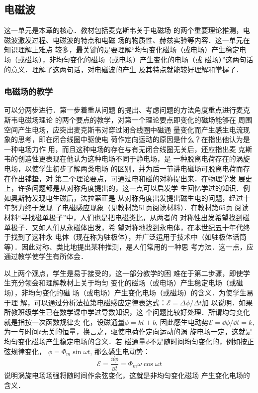 \subsection{电磁波}
这一单元是本章的核心．教材包括麦克斯韦关于电磁场
的两个重要理论推测，电磁波激发过程、电磁波的特点和电磁
场的物质性、赫兹实验等内容．这一单元在知识理解上难点
较多，最关键的是要理解“均匀变化磁场（或电场）产生稳定电
场（或磁场），非均匀变化的磁场（或电场）产生变化的电场（或
磁场）”这两句话的意义．理解了这两句话，对电磁波的产生
及其特点就能较好理解和掌握了．

\subsubsection{电磁场的教学}

可以分两步进行．第一步着重从问题
的提出、考虑问题的方法角度重点进行麦克斯韦电磁场理论
的两个要点的教学，对第一个理论要点即变化的磁场能够在
周围空间产生电场，应突出麦克斯韦对穿过闭合线圈中磁通
量变化而产生感生电流现象的思考，即在闭合线圈中驱使电
荷作定向运动的原因是什么？在指出他认为是一种电场力作
用，而且这种电场的存在与有无闭合线圈无关后，还应指出麦
克斯韦的创造性更表现在他认为这种电场不同于静电场，是
一种脱离电荷存在的涡旋电场，以使学生初步了解两类电场
的区别，并为后一节讲电磁场可脱离电荷而存在作出铺垫，对
第二个理论要点，可通过电和磁的对称提出来．在物理学发
展史上，许多问题都是从对称角度提出的，这一点可以启发学
生回忆学过的知识．例如奥斯特发现电生磁后，法拉第正是
从对称角度出发提出磁生电的问题，经过十年努力终于发现
了电磁感应现象（见教材第51页阅读材料）．在教材第65页
阅读材料“寻找磁单极子”中，人们也是把电磁类比，从两者的
对称性出发希望找到磁单极子．又如人们从永磁体出发，希
望对称地找到永电体，在本世纪五十年代终于找到了这种永
电体（现在称为驻极体），并广泛运用于技术中（如驻极体话筒
等）．因此对称、类比地提出某种推测，是人们常用的一种思
考方法．这一点，应通过教学使学生有所体会．

以上两个观点，学生是易于接受的，这一部分教学的困
难在于第二步骤，即使学生充分领会和理解教材上关于均匀
变化的磁场（或电场）产生稳定电场（或磁场），非均匀变化的磁
场（或电场）产生变化电场（或磁场）的含义．为使学生易于理
解，可以通过分析法拉第电磁感应定律表达式：$\mathcal{E}=\Delta \phi/\Delta t$加
以说明．如果所教班级学生已在数学课中学过导数知识，这
个问题比较好处理．所谓均匀变化就是指按一次函数规律变
化，设磁通量$\phi=kt+b$, 因此感生电动势$\mathcal{E}=\dd\phi/\dd t=k$, 为一与时间$t$无关的恒量，换言之，驱使电荷作定向运动的涡
旋电场一定，这就是均匀变化磁场产生稳定电场的含义．若
磁通量$\phi$不是随时间均匀变化的，例如按正弦规律变化，
$\phi=\Phi_m \sin\omega t$, 那么感生电动势：
\[\mathcal{E}=\frac{\dd\phi}{\dd t}=\Phi_m \omega \cos \omega t\]
说明涡旋电场场强将随时间作余弦变化，这就是非均匀变化磁场
产生变化电场的含义．


